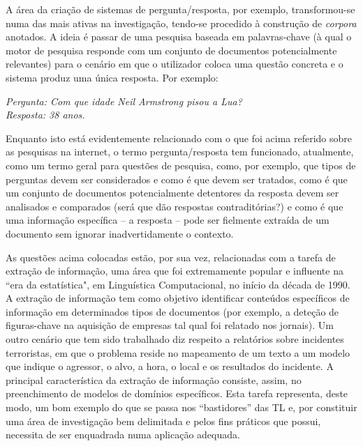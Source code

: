 \documentclass[]{../metanetpaper}
\begin{document}
\begin{multicols}{2}

A área da criação de sistemas de pergunta/resposta, por exemplo, transformou-se numa das mais ativas na investigação, tendo-se procedido à construção de \textit{corpora} anotados. A ideia é passar de uma pesquisa baseada em palavras-chave (à qual o motor de pesquisa responde com um conjunto de do\-cu\-men\-tos potencialmente relevantes) para o cenário em que o utilizador coloca uma questão concreta e o sistema produz uma única resposta. Por exemplo: 

\textit{Pergunta: Com que idade Neil Armstrong pisou a Lua?}\\
\textit{Resposta: 38 anos.}

Enquanto isto está evidentemente relacionado com o que foi acima referido sobre as pesquisas na internet, o termo pergunta/resposta tem funcionado, atualmente, como um termo geral para questões de pesquisa, como, por exemplo, que tipos de perguntas devem ser considerados e como é que devem ser tratados, como é que um conjunto de documentos potencialmente detentores da resposta devem ser analisados e comparados (será que dão respostas contraditórias?) e como é que uma informação específica – a resposta – pode ser fielmente extraída de um documento sem ignorar inadvertidamente o contexto.

As questões acima colocadas estão, por sua vez, relacionadas com a tarefa de extração de informação, uma área que foi extremamente popular e influente na “era da estatística", em Linguística Computacional, no início da década de 1990. A extração de informação tem como objetivo identificar conteúdos específicos de informação em determinados tipos de documentos (por exemplo, a deteção de figuras-chave na aquisição de empresas tal qual foi relatado nos jornais). Um outro cenário que tem sido trabalhado diz respeito a relatórios sobre incidentes terroristas, em que o problema reside no mapeamento de um texto a um modelo que indique o agressor, o alvo, a hora, o local e os resultados do incidente. A principal característica da extração de informação consiste, assim, no preenchimento de modelos de domínios específicos. Esta tarefa representa, deste modo, um bom exemplo do que se passa nos “bastidores” das TL e, por constituir uma área de investigação bem delimitada e pelos fins práticos que possui, necessita de ser enquadrada numa aplicação adequada.


\end{multicols}
\end{document}
